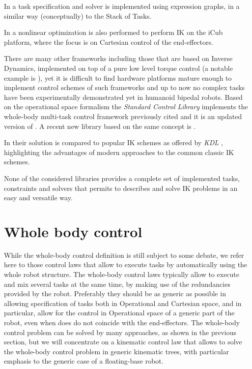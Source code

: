 In \cite{Aertbelien2014-iv} a task specification and solver is implemented using expression graphs, in a similar way (conceptually) to the Stack of Tasks.

In \cite{Pattacini2010-gr} a nonlinear optimization is also performed to perform IK on the iCub platform, where the focus is on Cartesian control of the end-effectors.

There are many other frameworks including those that are based on Inverse Dynamics, implemented on top of a pure low level torque control (a notable example is \cite{Sentis2010-bq}), yet it is difficult to find hardware platforms mature enough to implement control schemes of such frameworks and up to now no complex tasks have been experimentally demonstrated yet in humanoid bipedal robots.
Based on the operational space formalism the \emph{Standard Control Library} \cite{Menon_undated-hv} implements the whole-body multi-task control framework previously cited and it is an updated version of \cite{Philippsen2011-mq}.
A recent new library based on the same concept is \cite{Fok2015-cn}. 

In \cite{Beeson_undated-te} their solution is compared to popular IK schemes as offered by \emph{KDL} \cite{Smits2011-db}, highlighting the advantages of modern approaches to the common classic IK schemes.

None of the considered libraries provides a complete set of implemented tasks, constraints and solvers that permits to describes and solve IK problems in an easy and versatile way.

\section{Whole body control}
\label{sec:walkman_wholebody}
While the whole-body control definition is still subject to some debate, we refer here to those control laws that allow to execute tasks by automatically using the whole robot structure. The whole-body control laws typically allow to execute and mix several tasks at the same time,  by making use of the redundancies provided by the robot. Preferably they should be as generic as possible in allowing specification of tasks both in Operational and Cartesian space, and in particular, allow for the control in Operational space of a generic part of the robot, even when does do not coincide with the end-effectors. The whole-body control  problem can be solved by many approaches, as shown in the previous section, but we will concentrate on a kinematic control law that allows to solve the whole-body control problem  in generic kinematic trees, with particular emphasis to the generic case of a floating-base robot.

